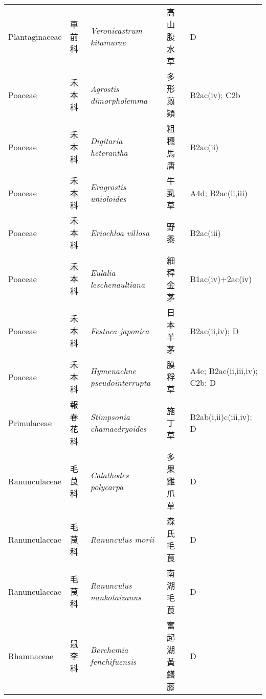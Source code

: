 {\begin{longtable}{p{2.5cm}p{2.5cm}p{4.5cm}p{2.5cm}p{3cm}}
    Plantaginaceae & 車前科 & \textit{Veronicastrum kitamurae}  & 高山腹水草 & D \index{Veronicastrum@\textit{Veronicastrum}!kitamurae@\textit{kitamurae}}  \index{高山腹水草} \\
    Poaceae & 禾本科 & \textit{Agrostis dimorpholemma}  & 多形翦穎 & B2ac(iv); C2b \index{Agrostis@\textit{Agrostis}!dimorpholemma@\textit{dimorpholemma}}  \index{多形翦穎} \\
    Poaceae & 禾本科 & \textit{Digitaria heterantha}  & 粗穗馬唐 & B2ac(ii) \index{Digitaria@\textit{Digitaria}!heterantha@\textit{heterantha}}  \index{粗穗馬唐} \\
    Poaceae & 禾本科 & \textit{Eragrostis unioloides}  & 牛虱草 & A4d; B2ac(ii,iii) \index{Eragrostis@\textit{Eragrostis}!unioloides@\textit{unioloides}}  \index{牛虱草} \\
    Poaceae & 禾本科 & \textit{Eriochloa villosa}  & 野黍 & B2ac(iii) \index{Eriochloa@\textit{Eriochloa}!villosa@\textit{villosa}}  \index{野黍} \\
    Poaceae & 禾本科 & \textit{Eulalia leschenaultiana}  & 細稈金茅 & B1ac(iv)+2ac(iv) \index{Eulalia@\textit{Eulalia}!leschenaultiana@\textit{leschenaultiana}}  \index{細稈金茅} \\
    Poaceae & 禾本科 & \textit{Festuca japonica}  & 日本羊茅 & B2ac(ii,iv); D \index{Festuca@\textit{Festuca}!japonica@\textit{japonica}}  \index{日本羊茅} \\
    Poaceae & 禾本科 & \textit{Hymenachne pseudointerrupta}  & 膜稃草 & A4c; B2ac(ii,iii,iv); C2b; D \index{Hymenachne@\textit{Hymenachne}!pseudointerrupta@\textit{pseudointerrupta}}  \index{膜稃草} \\
    Primulaceae & 報春花科 & \textit{Stimpsonia chamaedryoides}  & 施丁草 & B2ab(i,ii)c(iii,iv); D \index{Stimpsonia@\textit{Stimpsonia}!chamaedryoides@\textit{chamaedryoides}}  \index{施丁草} \\
    Ranunculaceae & 毛茛科 & \textit{Calathodes polycarpa}  & 多果雞爪草 & D \index{Calathodes@\textit{Calathodes}!polycarpa@\textit{polycarpa}}  \index{多果雞爪草} \\
    Ranunculaceae & 毛茛科 & \textit{Ranunculus morii}  & 森氏毛茛 & D \index{Ranunculus@\textit{Ranunculus}!morii@\textit{morii}}  \index{森氏毛茛} \\
    Ranunculaceae & 毛茛科 & \textit{Ranunculus nankotaizanus}  & 南湖毛茛 & D \index{Ranunculus@\textit{Ranunculus}!nankotaizanus@\textit{nankotaizanus}}  \index{南湖毛茛} \\
    Rhamnaceae & 鼠李科 & \textit{Berchemia fenchifuensis}  & 奮起湖黃鱔藤 & D \index{Berchemia@\textit{Berchemia}!fenchifuensis@\textit{fenchifuensis}}  \index{奮起湖黃鱔藤} \\

\end{longtable}}
